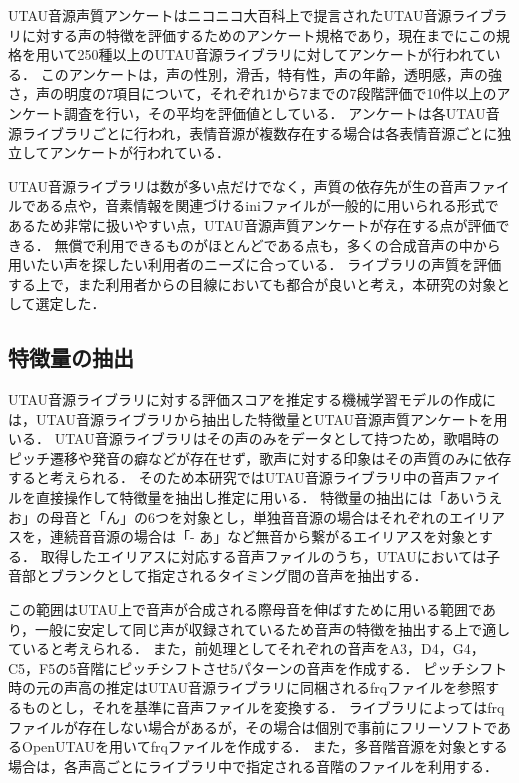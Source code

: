 \documentclass[a4j,8pt,twocolumn]{extarticle}
\begin{document}
UTAU音源声質アンケートはニコニコ大百科上で提言されたUTAU音源ライブラリに対する声の特徴を評価するためのアンケート規格であり，現在までにこの規格を用いて250種以上のUTAU音源ライブラリに対してアンケートが行われている．
このアンケートは，声の性別，滑舌，特有性，声の年齢，透明感，声の強さ，声の明度の7項目について，それぞれ1から7までの7段階評価で10件以上のアンケート調査を行い，その平均を評価値としている．
アンケートは各UTAU音源ライブラリごとに行われ，表情音源が複数存在する場合は各表情音源ごとに独立してアンケートが行われている．

UTAU音源ライブラリは数が多い点だけでなく，声質の依存先が生の音声ファイルである点や，音素情報を関連づけるiniファイルが一般的に用いられる形式であるため非常に扱いやすい点，UTAU音源声質アンケートが存在する点が評価できる．
無償で利用できるものがほとんどである点も，多くの合成音声の中から用いたい声を探したい利用者のニーズに合っている．
ライブラリの声質を評価する上で，また利用者からの目線においても都合が良いと考え，本研究の対象として選定した．

\subsection{特徴量の抽出}
UTAU音源ライブラリに対する評価スコアを推定する機械学習モデルの作成には，UTAU音源ライブラリから抽出した特徴量とUTAU音源声質アンケートを用いる．
UTAU音源ライブラリはその声のみをデータとして持つため，歌唱時のピッチ遷移や発音の癖などが存在せず，歌声に対する印象はその声質のみに依存すると考えられる．
そのため本研究ではUTAU音源ライブラリ中の音声ファイルを直接操作して特徴量を抽出し推定に用いる．
特徴量の抽出には「あいうえお」の母音と「ん」の6つを対象とし，単独音音源の場合はそれぞれのエイリアスを，連続音音源の場合は「- あ」など無音から繋がるエイリアスを対象とする．
取得したエイリアスに対応する音声ファイルのうち，UTAUにおいては子音部とブランクとして指定されるタイミング間の音声を抽出する．

この範囲はUTAU上で音声が合成される際母音を伸ばすために用いる範囲であり，一般に安定して同じ声が収録されているため音声の特徴を抽出する上で適していると考えられる．
また，前処理としてそれぞれの音声をA3，D4，G4，C5，F5の5音階にピッチシフトさせ5パターンの音声を作成する．
ピッチシフト時の元の声高の推定はUTAU音源ライブラリに同梱されるfrqファイルを参照するものとし，それを基準に音声ファイルを変換する．
ライブラリによってはfrqファイルが存在しない場合があるが，その場合は個別で事前にフリーソフトであるOpenUTAUを用いてfrqファイルを作成する．
また，多音階音源を対象とする場合は，各声高ごとにライブラリ中で指定される音階のファイルを利用する．
\end{document}
